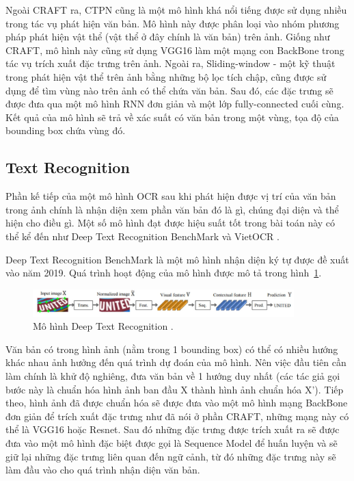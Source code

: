 Ngoài CRAFT ra, CTPN \cite{tian2016detecting} cũng là một mô hình khá nổi tiếng được sử dụng nhiều trong tác vụ phát hiện văn bản. Mô hình này được phân loại vào nhóm phương pháp phát hiện vật thể (vật thể ở đây chính là văn bản) trên ảnh. Giống như CRAFT, mô hình này cũng sử dụng VGG16 làm một mạng con BackBone trong tác vụ trích xuất đặc trưng trên ảnh. Ngoài ra, Sliding-window - một kỹ thuật trong phát hiện vật thể trên ảnh bằng những bộ lọc tích chập, cũng được sử dụng để tìm vùng nào trên ảnh có thể chứa văn bản. Sau đó, các đặc trưng sẽ được đưa qua một mô hình RNN đơn giản và một lớp fully-connected cuối cùng. Kết quả của mô hình sẽ trả về xác suất có văn bản trong một vùng, tọa độ của bounding box chứa vùng đó. 
\subsection{Text Recognition}
Phần kế tiếp của một mô hình OCR sau khi phát hiện được vị trí của văn bản trong ảnh
chính là nhận diện xem phần văn bản đó là gì, chúng đại diện và thể hiện cho điều gì. Một
số mô hình đạt được hiệu suất tốt trong bài toán này có thể kể đến như Deep Text
Recognition BenchMark \cite{baek2019wrong} và VietOCR \cite{VietOCR}.

Deep Text Recognition BenchMark là một mô hình nhận diện ký tự được đề xuất vào năm 2019. Quá trình hoạt động của mô hình được mô tả
trong hình~\ref{fig_2.8}.

\begin{figure}
\centering
\includegraphics[width=0.9\textwidth]{mep_img/Capture5.JPG}
\caption{Mô hình Deep Text Recognition \cite{baek2019wrong}. }\label{fig_2.8}
\end{figure}

Văn bản có trong hình ảnh (nằm trong 1 bounding box) có thể có nhiều hướng khác nhau
ảnh hưởng đến quá trình dự đoán của mô hình. Nên việc đầu tiên cần làm chính là khử độ
nghiêng, đưa văn bản về 1 hướng duy nhất (các tác giả gọi bước này là chuẩn hóa hình ảnh
ban đầu X thành hình ảnh chuẩn hóa X’). Tiếp theo, hình ảnh đã được chuẩn hóa sẽ được
đưa vào một mô hình mạng BackBone đơn giản để trích xuất đặc trưng như đã nói ở phần
CRAFT, những mạng này có thể là VGG16 hoặc Resnet. Sau đó những đặc trưng được
trích xuất ra sẽ được đưa vào một mô hình đặc biệt được gọi là Sequence Model để huấn
luyện và sẽ giữ lại những đặc trưng liên quan đến ngữ cảnh, từ đó những đặc trưng này sẽ
làm đầu vào cho quá trình nhận diện văn bản.

